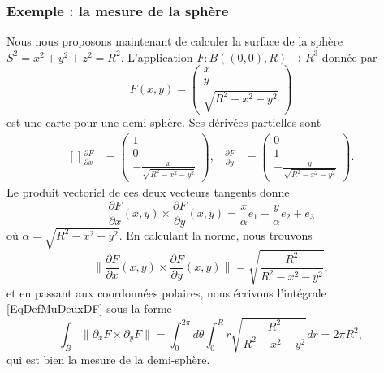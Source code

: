 \subsubsection{Exemple : la mesure de la sphère}

Nous nous proposons maintenant de calculer la surface de la sphère $S^2=x^2+y^2+z^2=R^2$. L'application $F\colon B( (0,0),R)\to R^3$ donnée par
\begin{equation}
	F(x,y)=\begin{pmatrix}
		x	\\
		y	\\
		\sqrt{R^2-x^2-y^2}
	\end{pmatrix}
\end{equation}
est une carte pour une demi-sphère. Ses dérivées partielles sont
\begin{equation}
	\begin{aligned}[]
		\frac{ \partial F }{ \partial x }&=\begin{pmatrix}
			1	\\
			0	\\
			-\frac{ x }{ \sqrt{R^2-x^2-y^2} }
		\end{pmatrix},
		&\frac{ \partial F }{ \partial y }&=\begin{pmatrix}
			0	\\
			1	\\
			-\frac{ y }{ \sqrt{R^2-x^2-y^2} }
		\end{pmatrix}.
	\end{aligned}
\end{equation}
Le produit vectoriel de ces deux vecteurs tangents donne
\begin{equation}
	\frac{ \partial F }{ \partial x }(x,y)\times\frac{ \partial F }{ \partial y }(x,y)=\frac{ x }{ \alpha }e_1+\frac{ y }{ \alpha }e_2+e_3
\end{equation}
où $\alpha=\sqrt{R^2-x^2-y^2}$. En calculant la norme, nous trouvons
\begin{equation}
	\| \frac{ \partial F }{ \partial x }(x,y)\times\frac{ \partial F }{ \partial y }(x,y)\| =\sqrt{  \frac{ R^2 }{ R^2-x^2-y^2 } },
\end{equation}
et en passant aux coordonnées polaires, nous écrivons l'intégrale \eqref{EqDefMuDeuxDF} sous la forme
\begin{equation}
	\int_B\| \partial_xF\times\partial_yF \|=\int_0^{2\pi}d\theta\int_0^R r\sqrt{  \frac{ R^2 }{ R^2-x^2-y^2 } }dr=2\pi R^2,
\end{equation}
qui est bien la mesure de la demi-sphère.


